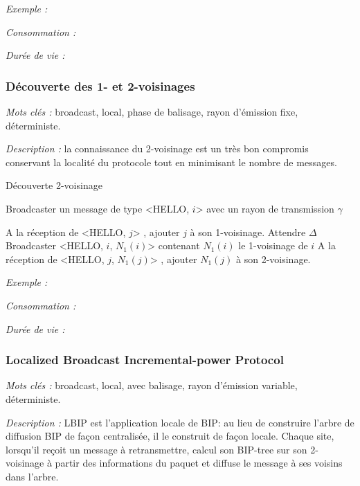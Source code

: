 \emph{Exemple :} 

\emph{Consommation :} 

\emph{Durée de vie :} 



\subsubsection{Découverte des 1- et 2-voisinages}

\emph{Mots clés :} broadcast, local, phase de balisage, rayon d'émission fixe, déterministe.

\emph{Description :} la connaissance du 2-voisinage est un très bon compromis conservant la localité du protocole tout en minimisant le nombre de messages.


\begin{algorithm}[h]
\caption{Découverte 2-voisinage}
\label{algo_k_voisinage}
\begin{algorithmic}

	\STATE Broadcaster un message de type <HELLO, $i$> avec un rayon de transmission $\gamma$
\ENDFOR

\STATE A la réception de <HELLO, $j$> , ajouter $j$ à son 1-voisinage.
\STATE Attendre $\Delta$
	\STATE Broadcaster <HELLO, $i$, $N_1(i)$> contenant $N_1(i)$ le 1-voisinage de $i$
	\STATE A la réception de <HELLO, $j$, $N_1(j)$> , ajouter $N_1(j)$ à son 2-voisinage.
	
\ENDFOR
\end{algorithmic}
\end{algorithm}

\emph{Exemple :} 

\emph{Consommation :} 

\emph{Durée de vie :} 



\subsubsection{Localized Broadcast Incremental-power Protocol \cite{Ingelrest2004}}
\emph{Mots clés :} broadcast, local, avec balisage, rayon d'émission variable, déterministe.

\emph{Description :} LBIP est l'application locale de BIP: au lieu de construire l'arbre de diffusion BIP de façon centralisée, il le construit de façon locale.
Chaque site, lorsqu'il reçoit un message à retransmettre, calcul son BIP-tree sur son 2-voisinage à partir des informations du paquet et diffuse le message à ses voisins dans l'arbre.


